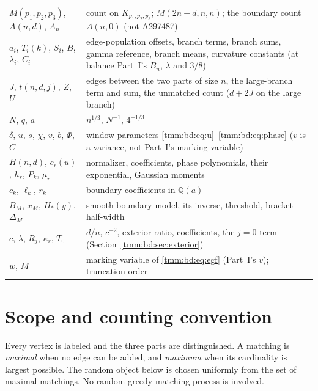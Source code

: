 \documentclass[11pt,letterpaper]{article}
\theoremstyle{remark}\newtheorem{remark}[theorem]{Remark}
\newcommand{\wtag}{\textup{\textbf{[write]}}}
\begin{document}
\begin{center}
\small
\begin{tabular}{@{}>{\raggedright\arraybackslash}p{} >{\raggedright\arraybackslash}p{}@{}}
\toprule
\multicolumn{2}{@{}l}{\emph{Reading conventions of Part~II} \wtag}\\
\midrule
$M(p_1,p_2,p_3)$, $A(n,d)$, $A_n$ & count on $K_{p_1,p_2,p_3}$; $M(2n+d,n,n)$; the boundary count $A(n,0)$ (not A297487)\\
$a_i$, $T_i(k)$, $S_i$, $B$, $\lambda_i$, $C_i$ & edge-population offsets, branch terms, branch sums, gamma reference, branch means, curvature constants (at balance Part~I's $B_n$, $\lambda$ and $3/8$)\\
$J$, $t(n,d,j)$, $Z$, $U$ & edges between the two parts of size $n$, the large-branch term and sum, the unmatched count ($d+2J$ on the large branch)\\
$N$, $q$, $a$ & $n^{1/3}$, $N^{-1}$, $4^{-1/3}$\\
$\delta$, $u$, $s$, $\chi$, $v$, $b$, $\Phi$, $C$ & window parameters \eqref{tmm:bd:eq:u}--\eqref{tmm:bd:eq:phase} ($v$ is a variance, not Part~I's marking variable)\\
$H(n,d)$, $c_r(u)$, $h_r$, $P_k$, $\mu_r$ & normalizer, coefficients, phase polynomials, their exponential, Gaussian moments\\
$c_k$, $\ell_k$, $r_k$ & boundary coefficients in $\mathbb Q(a)$\\
$B_M$, $x_M$, $H_*(y)$, $\Delta_M$ & smooth boundary model, its inverse, threshold, bracket half-width\\
$c$, $\lambda$, $R_j$, $\kappa_r$, $T_0$ & $d/n$, $c^{-2}$, exterior ratio, coefficients, the $j=0$ term (Section~\ref{tmm:bd:sec:exterior})\\
$w$, $M$ & marking variable of \eqref{tmm:bd:eq:egf} (Part~I's $v$); truncation order\\
\bottomrule
\end{tabular}
\end{center}

\section{Scope and counting convention}\label{tmm:bd:sec:scope}
Every vertex is labeled and the three parts are distinguished. A matching is \emph{maximal} when no edge can be added, and \emph{maximum} when its cardinality is largest possible. The random object below is chosen uniformly from the set of maximal matchings. No random greedy matching process is involved.
\end{document}
